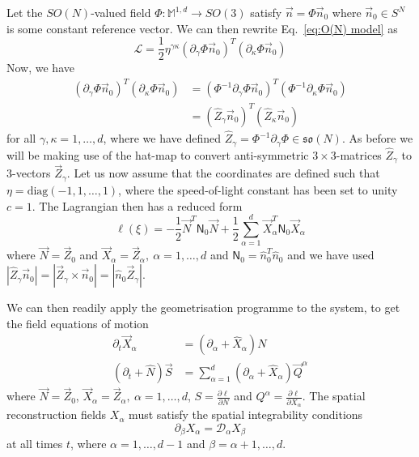 Let the $SO(N)$-valued field $\Phi : \mathbb{M}^{1,d} \to SO(3)$ satisfy $\vec{n} = \Phi \vec{n}_0$ where $\vec{n}_0 \in S^N$ is some constant reference vector. We can then rewrite Eq.~\ref{eq:O(N) model} as
\begin{equation}
\mathcal{L} = \frac{1}{2} \eta^{\gamma \kappa} (\partial_\gamma \Phi \vec{n}_0)^T (\partial_\kappa \Phi  \vec{n}_0) 
\end{equation}
Now, we have
\begin{equation}
\begin{aligned}
(\partial_\gamma \Phi \vec{n}_0)^T (\partial_\kappa \Phi  \vec{n}_0) & = (\Phi^{-1} \partial_\gamma \Phi \vec{n}_0)^T (\Phi^{-1} \partial_\kappa \Phi  \vec{n}_0) \\
& = (\hat{Z}_\gamma \vec{n}_0)^T (\hat{Z}_\kappa \vec{n}_0)
\end{aligned}
\end{equation}
for all $\gamma,\kappa = 1,\dots, d$, where we have defined $\hat{Z}_\gamma = \Phi^{-1} \partial_\gamma \Phi \in \mathfrak{so}(N)$. As before we will  be making use of the hat-map to convert anti-symmetric $3\times 3$-matrices $\hat{Z}_\gamma$ to $3$-vectors $\vec{Z}_\gamma$. Let us now assume that the coordinates are defined such that $\eta = \text{diag}(-1, 1, \dots, 1)$, where the speed-of-light constant has been set to unity $c=1$. The Lagrangian then has a reduced form
\begin{equation}
\ell(\xi) = - \frac{1}{2} \vec{N}^T \mathsf{N}_0 \vec{N} + \frac{1}{2} \sum_{\alpha=1}^d \vec{X}_\alpha^T \mathsf{N}_0 \vec{X}_\alpha
\end{equation}
where $\vec{N} = \vec{Z}_0$ and $\vec{X}_\alpha = \vec{Z}_\alpha,\ \alpha = 1, \dots, d$ and $\mathsf{N}_0 = \hat{n}_0^T \hat{n}_0$ and we have used $|\hat{Z}_\gamma \vec{n}_0 | = |\vec{Z}_\gamma \times  \vec{n}_0 | = | \hat{n}_0 \vec{Z}_\gamma  |$.

We can then readily apply the geometrisation programme to the system, to get the field equations of motion
\begin{subequations} 
\begin{align}
\partial_t \vec{X}_\alpha & = (\partial_\alpha + \hat{X}_\alpha) N \\
(\partial_t + \hat{N}) \vec{S} & = \sum_{\alpha=1}^d (\partial_\alpha + \hat{X}_\alpha) \vec{Q}^\alpha  \label{eq:dynamic field equations}
\end{align}
\end{subequations}
where $\vec{N} = \vec{Z}_0$, $\vec{X}_\alpha = \vec{Z}_\alpha,\ \alpha = 1, \dots, d$, $S = \frac{\partial \ell}{\partial N}$ and $Q^\alpha = \frac{\partial \ell}{\partial X_\alpha}$. The spatial reconstruction fields $X_\alpha$ must satisfy the spatial integrability conditions
\begin{equation}
\partial_\beta X_\alpha = \mathcal{D}_\alpha X_\beta
\end{equation}
at all times $t$, where $\alpha = 1, \dots, d-1$ and $\beta = \alpha+1, \dots, d$.


